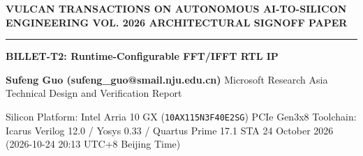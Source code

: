 \documentclass[11pt,a4paper]{article}
\begin{document}
{\scriptsize\sffamily\textcolor{vulcan}{\textbf{VULCAN TRANSACTIONS ON AUTONOMOUS AI-TO-SILICON ENGINEERING \hfill VOL. 2026 \textperiodcentered{} ARCHITECTURAL SIGNOFF PAPER}}\par}

\vspace{1pt}\textcolor{vulcan}{\rule{\textwidth}{1.2pt}}\vspace{4pt}

\begin{center}

{\sffamily\LARGE\bfseries BILLET-T2: Runtime-Configurable FFT/\allowbreak{}IFFT RTL IP\par}\vspace{3pt}

{\small\sffamily\textbf{Sufeng Guo (\allowbreak{}sufeng\_\allowbreak{}guo@smail.nju.edu.cn)\allowbreak{}} \textperiodcentered{} Microsoft Research Asia \textperiodcentered{} Technical Design and Verification Report\par}\vspace{1pt}

{\scriptsize\sffamily\textcolor{black!75}{Silicon Platform: Intel Arria 10 GX (\texttt{10AX115N3F40E2SG}) PCIe Gen3x8 \textperiodcentered{} Toolchain: Icarus Verilog 12.0 / Yosys 0.33 / Quartus Prime 17.1 STA \textperiodcentered{} 24 October 2026 (\allowbreak{}2026-10-24 20:13 UTC+\allowbreak{}8 Beijing Time)\allowbreak{}}\par}

\end{center}\vspace{2pt}
\end{document}
